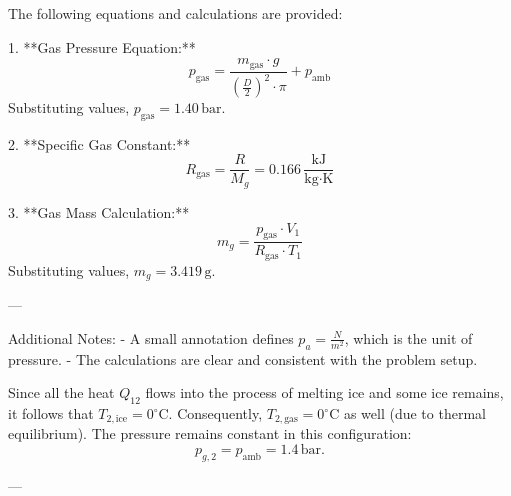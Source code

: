 The following equations and calculations are provided:

1. **Gas Pressure Equation:**  
   \[
   p_{\text{gas}} = \frac{m_{\text{gas}} \cdot g}{\left(\frac{D}{2}\right)^2 \cdot \pi} + p_{\text{amb}}
   \]  
   Substituting values, \( p_{\text{gas}} = 1.40 \, \text{bar} \).

2. **Specific Gas Constant:**  
   \[
   R_{\text{gas}} = \frac{R}{M_g} = 0.166 \, \frac{\text{kJ}}{\text{kg·K}}
   \]

3. **Gas Mass Calculation:**  
   \[
   m_g = \frac{p_{\text{gas}} \cdot V_1}{R_{\text{gas}} \cdot T_1}
   \]  
   Substituting values, \( m_g = 3.419 \, \text{g} \).

---

Additional Notes:  
- A small annotation defines \( p_a = \frac{N}{m^2} \), which is the unit of pressure.  
- The calculations are clear and consistent with the problem setup.

Since all the heat \( Q_{12} \) flows into the process of melting ice and some ice remains, it follows that \( T_{2,\text{ice}} = 0^\circ\text{C} \). Consequently, \( T_{2,\text{gas}} = 0^\circ\text{C} \) as well (due to thermal equilibrium). The pressure remains constant in this configuration:  
\[
p_{g,2} = p_{\text{amb}} = 1.4 \, \text{bar}.
\]

---